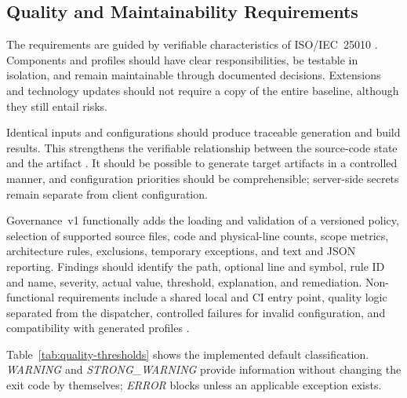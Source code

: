 \subsection{Quality and Maintainability Requirements}
\label{subsec:qualitaets-wartbarkeitsanforderungen}

The requirements are guided by verifiable characteristics of ISO/IEC~25010
\parencite{iso25010-2023}. Components and profiles should have clear
responsibilities, be testable in isolation, and remain maintainable through
documented decisions. Extensions and technology updates should not require a
copy of the entire baseline, although they still entail risks.

Identical inputs and configurations should produce traceable generation and
build results. This strengthens the verifiable relationship between the source-code
state and the artifact \parencite{lamb2022reproducible-builds}. It should be
possible to generate target artifacts in a controlled manner, and configuration
priorities should be comprehensible; server-side secrets remain separate from
client configuration.

Governance~v1 functionally adds the loading and validation of a versioned
policy, selection of supported source files, code and physical-line counts,
scope metrics, architecture rules, exclusions, temporary exceptions, and text
and JSON reporting. Findings should identify the path, optional line and
symbol, rule ID and name, severity, actual value, threshold, explanation, and
remediation. Non-functional requirements include a shared local and CI entry
point, quality logic separated from the dispatcher, controlled failures for
invalid configuration, and compatibility with generated profiles
\parencite{kleiveist2026quality-policy}.

Table~\ref{tab:quality-thresholds} shows the implemented default
classification. \emph{WARNING} and \emph{STRONG\_WARNING} provide information
without changing the exit code by themselves; \emph{ERROR} blocks unless an
applicable exception exists.

